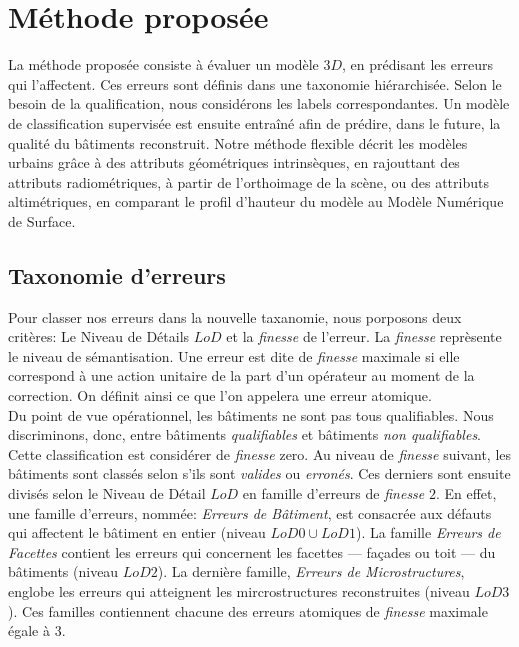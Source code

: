 \documentclass[a4paper,french]{article}
\begin{document}
    \section{Méthode proposée}

    La méthode proposée consiste à évaluer un modèle $3D$, en prédisant les erreurs qui l'affectent. Ces erreurs sont définis dans une taxonomie hiérarchisée. Selon le besoin de la qualification, nous considérons les labels correspondantes. Un modèle de classification supervisée est ensuite entraîné afin de prédire, dans le future, la qualité du bâtiments reconstruit. Notre méthode flexible décrit les modèles urbains grâce à des attributs géométriques intrinsèques, en rajouttant des attributs radiométriques, à partir de l'orthoimage de la scène, ou des attributs altimétriques, en comparant le profil d'hauteur du modèle au Modèle Numérique de Surface.

    \subsection{Taxonomie d'erreurs}

    Pour classer nos erreurs dans la nouvelle taxanomie, nous porposons deux critères: Le Niveau de Détails $LoD$ et la \emph{finesse} de l'erreur. La \emph{finesse} reprèsente le niveau de sémantisation. Une erreur est dite de \emph{finesse} maximale si elle correspond à une action unitaire de la part d'un opérateur au moment de la correction. On définit ainsi ce que l'on appelera une erreur atomique.\\
    Du point de vue opérationnel, les bâtiments ne sont pas tous qualifiables. Nous discriminons, donc, entre bâtiments \emph{qualifiables} et bâtiments \emph{non qualifiables}. Cette classification est considérer de \emph{finesse} zero. Au niveau de \emph{finesse} suivant, les bâtiments sont classés selon s'ils sont \emph{valides} ou \emph{erronés}. Ces derniers sont ensuite divisés selon le Niveau de Détail $LoD$ en famille d'erreurs de \emph{finesse} $2$. En effet, une famille d'erreurs, nommée: \emph{Erreurs de Bâtiment}, est consacrée aux défauts qui affectent le bâtiment en entier (niveau $LoD 0\cup LoD 1$). La famille \emph{Erreurs de Facettes} contient les erreurs qui concernent les facettes --- façades ou toit --- du bâtiments (niveau $LoD 2$). La dernière famille, \emph{Erreurs de Microstructures}, englobe les erreurs qui atteignent les mircrostructures reconstruites (niveau $LoD 3$). Ces familles contiennent chacune des erreurs atomiques de \emph{finesse} maximale égale à $3$.
\end{document}
